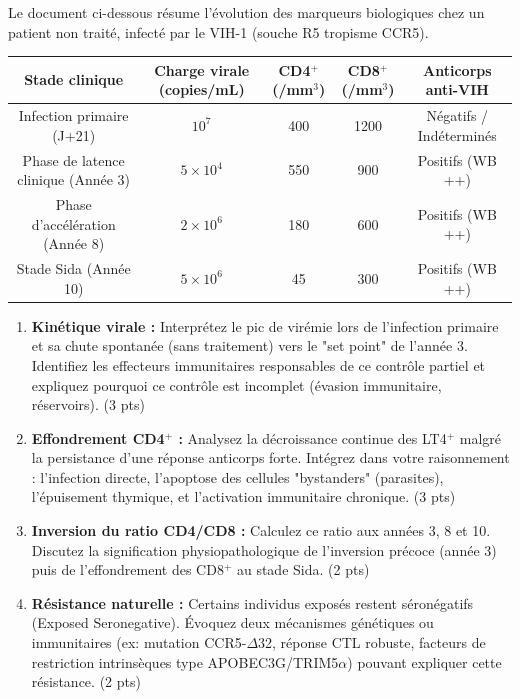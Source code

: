 \documentclass[11pt]{article}
\begin{document}
\begin{exercice}
Le document ci-dessous résume l'évolution des marqueurs biologiques chez un patient non traité, infecté par le VIH-1 (souche R5 tropisme CCR5).
\begin{center}
\begin{tabular}{|c|c|c|c|c|}
\hline
\textbf{Stade clinique} & \textbf{Charge virale (copies/mL)} & \textbf{CD4$^+$ (/mm$^3$)} & \textbf{CD8$^+$ (/mm$^3$)} & \textbf{Anticorps anti-VIH} \\
\hline
Infection primaire (J+21) & $10^7$ & 400 & 1200 & Négatifs / Indéterminés \\
\hline
Phase de latence clinique (Année 3) & $5 \times 10^4$ & 550 & 900 & Positifs (WB ++) \\
\hline
Phase d'accélération (Année 8) & $2 \times 10^6$ & 180 & 600 & Positifs (WB ++) \\
\hline
Stade Sida (Année 10) & $5 \times 10^6$ & 45 & 300 & Positifs (WB ++) \\
\hline
\end{tabular}
\end{center}
\begin{enumerate}
    \item \textbf{Kinétique virale :} Interprétez le pic de virémie lors de l'infection primaire et sa chute spontanée (sans traitement) vers le "set point" de l'année 3. Identifiez les effecteurs immunitaires responsables de ce contrôle partiel et expliquez pourquoi ce contrôle est incomplet (évasion immunitaire, réservoirs). (3 pts)
    \item \textbf{Effondrement CD4$^+$ :} Analysez la décroissance continue des LT4$^+$ malgré la persistance d'une réponse anticorps forte. Intégrez dans votre raisonnement : l'infection directe, l'apoptose des cellules "bystanders" (parasites), l'épuisement thymique, et l'activation immunitaire chronique. (3 pts)
    \item \textbf{Inversion du ratio CD4/CD8 :} Calculez ce ratio aux années 3, 8 et 10. Discutez la signification physiopathologique de l'inversion précoce (année 3) puis de l'effondrement des CD8$^+$ au stade Sida. (2 pts)
    \item \textbf{Résistance naturelle :} Certains individus exposés restent séronégatifs (Exposed Seronegative). Évoquez deux mécanismes génétiques ou immunitaires (ex: mutation CCR5-$\Delta$32, réponse CTL robuste, facteurs de restriction intrinsèques type APOBEC3G/TRIM5$\alpha$) pouvant expliquer cette résistance. (2 pts)
\end{enumerate}
\end{exercice}
\end{document}
